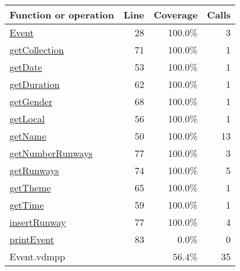 \begin{longtable}{|l|r|r|r|}
\hline
Function or operation & Line & Coverage & Calls \\
\hline
\hline
\hyperref[Event:28]{Event} & 28&100.0\% & 3 \\
\hline
\hyperref[getCollection:71]{getCollection} & 71&100.0\% & 1 \\
\hline
\hyperref[getDate:53]{getDate} & 53&100.0\% & 1 \\
\hline
\hyperref[getDuration:62]{getDuration} & 62&100.0\% & 1 \\
\hline
\hyperref[getGender:68]{getGender} & 68&100.0\% & 1 \\
\hline
\hyperref[getLocal:56]{getLocal} & 56&100.0\% & 1 \\
\hline
\hyperref[getName:50]{getName} & 50&100.0\% & 13 \\
\hline
\hyperref[getNumberRunways:77]{getNumberRunways} & 77&100.0\% & 3 \\
\hline
\hyperref[getRunways:74]{getRunways} & 74&100.0\% & 5 \\
\hline
\hyperref[getTheme:65]{getTheme} & 65&100.0\% & 1 \\
\hline
\hyperref[getTime:59]{getTime} & 59&100.0\% & 1 \\
\hline
\hyperref[insertRunway:77]{insertRunway} & 77&100.0\% & 4 \\
\hline
\hyperref[printEvent:83]{printEvent} & 83&0.0\% & 0 \\
\hline
\hline
Event.vdmpp & & 56.4\% & 35 \\
\hline
\end{longtable}

